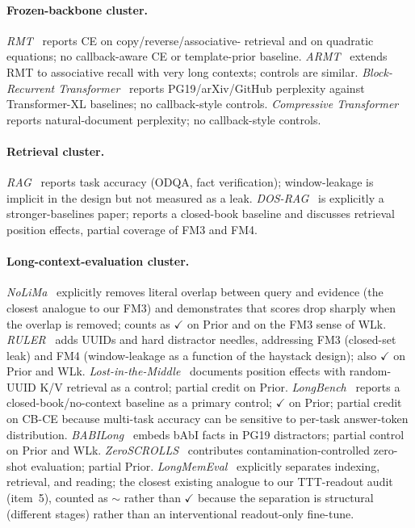 \documentclass{article}
\begin{document}
\paragraph{Frozen-backbone cluster.}
\emph{RMT}~\cite{rmt2022} reports CE on copy/reverse/associative-
retrieval and on quadratic equations; no callback-aware CE or
template-prior baseline. \emph{ARMT}~\cite{armt2024} extends RMT to
associative recall with very long contexts; controls are similar.
\emph{Block-Recurrent Transformer}~\cite{blockrecurrent2022} reports
PG19/arXiv/GitHub perplexity against Transformer-XL baselines; no
callback-style controls.  \emph{Compressive
Transformer}~\cite{compressive2019} reports natural-document
perplexity; no callback-style controls.

\paragraph{Retrieval cluster.}
\emph{RAG}~\cite{ragoriginal2020} reports task accuracy (ODQA,
fact verification); window-leakage is implicit in the design but
not measured as a leak.  \emph{DOS-RAG}~\cite{ragbaseline2025} is
explicitly a stronger-baselines paper; reports a closed-book
baseline and discusses retrieval position effects, partial coverage
of FM3 and FM4.

\paragraph{Long-context-evaluation cluster.}
\emph{NoLiMa}~\cite{nolima2025} explicitly removes literal overlap
between query and evidence (the closest analogue to our FM3) and
demonstrates that scores drop sharply when the overlap is removed;
counts as $\checkmark$ on Prior and on the FM3 sense of WLk.
\emph{RULER}~\cite{ruler2024} adds UUIDs and hard distractor
needles, addressing FM3 (closed-set leak) and FM4 (window-leakage as
a function of the haystack design); also $\checkmark$ on Prior and
WLk.  \emph{Lost-in-the-Middle}~\cite{lostmiddle2024} documents
position effects with random-UUID K/V retrieval as a control;
partial credit on Prior.  \emph{LongBench}~\cite{longbench2024}
reports a closed-book/no-context baseline as a primary control;
$\checkmark$ on Prior; partial credit on CB-CE because
multi-task accuracy can be sensitive to per-task answer-token
distribution.  \emph{BABILong}~\cite{babilong2024} embeds bAbI
facts in PG19 distractors; partial control on Prior and WLk.
\emph{ZeroSCROLLS}~\cite{zeroscrolls2023} contributes
contamination-controlled zero-shot evaluation; partial Prior.
\emph{LongMemEval}~\cite{longmemeval2025} explicitly separates
indexing, retrieval, and reading; the closest existing analogue to
our TTT-readout audit (item~5), counted as $\sim$ rather than
$\checkmark$ because the separation is structural (different stages)
rather than an interventional readout-only fine-tune.
\end{document}
